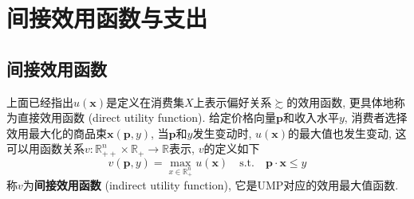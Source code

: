 \documentclass[cn, 12pt, math=mtpro2, bibstyle=apa, blue, twocol]{elegantbook}
\newcommand{\R}{\mathbb{R}}
\newcommand{\p}{\mathbf{p}}
\newcommand{\x}{\mathbf{x}}
\begin{document}
\section{间接效用函数与支出}
\subsection{间接效用函数}
上面已经指出$u(\x)$是定义在消费集$X$上表示偏好关系$\succsim$的效用函数, 更具体地称为直接效用函数 (direct utility function). 给定价格向量$\p$和收入水平$y$, 消费者选择效用最大化的商品束$\x(\p,y)$, 当$\p$和$y$发生变动时, $u(\x)$的最大值也发生变动, 这可以用函数关系$v:\R_{++}^n\times \R_+\to \R$表示, $v$的定义如下
\begin{equation}\label{eq1.11}
  v(\p,y)=\max_{x\in\R_+^n}u(\x)\quad\text{s.t.}\quad\p\cdot\x\leq y
\end{equation}
称$v$为\textbf{间接效用函数} (indirect utility function), 它是UMP对应的效用最大值函数.
\end{document}
